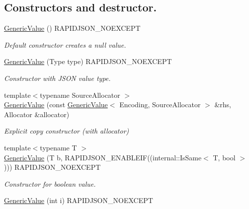 \subsection*{Constructors and destructor.}
\begin{DoxyCompactItemize}
\item 
\mbox{\label{classGenericValue_ab0205d57176d83814ea4e4598c596fe8}} 
\hyperlink{classGenericValue_ab0205d57176d83814ea4e4598c596fe8}{Generic\+Value} () R\+A\+P\+I\+D\+J\+S\+O\+N\+\_\+\+N\+O\+E\+X\+C\+E\+PT
\begin{DoxyCompactList}\small\item\em Default constructor creates a null value. \end{DoxyCompactList}\item 
\hyperlink{classGenericValue_a83c8f84b8e61f2f40414b703b75aea61}{Generic\+Value} (Type type) R\+A\+P\+I\+D\+J\+S\+O\+N\+\_\+\+N\+O\+E\+X\+C\+E\+PT
\begin{DoxyCompactList}\small\item\em Constructor with J\+S\+ON value type. \end{DoxyCompactList}\item 
{\footnotesize template$<$typename Source\+Allocator $>$ }\\\hyperlink{classGenericValue_a5161c0c98ba9144c50a38acde28a5ede}{Generic\+Value} (const \hyperlink{classGenericValue}{Generic\+Value}$<$ Encoding, Source\+Allocator $>$ \&rhs, Allocator \&allocator)
\begin{DoxyCompactList}\small\item\em Explicit copy constructor (with allocator) \end{DoxyCompactList}\item 
{\footnotesize template$<$typename T $>$ }\\\hyperlink{classGenericValue_a88f02daf621c42b96d49d608fa9214de}{Generic\+Value} (T b, R\+A\+P\+I\+D\+J\+S\+O\+N\+\_\+\+E\+N\+A\+B\+L\+E\+IF((internal\+::\+Is\+Same$<$ T, bool $>$))) R\+A\+P\+I\+D\+J\+S\+O\+N\+\_\+\+N\+O\+E\+X\+C\+E\+PT
\begin{DoxyCompactList}\small\item\em Constructor for boolean value. \end{DoxyCompactList}\item 
\mbox{\label{classGenericValue_aafc754ade38421c179f5c8933ecbaf45}} 
\hyperlink{classGenericValue_aafc754ade38421c179f5c8933ecbaf45}{Generic\+Value} (int i) R\+A\+P\+I\+D\+J\+S\+O\+N\+\_\+\+N\+O\+E\+X\+C\+E\+PT

\end{DoxyCompactItemize}
